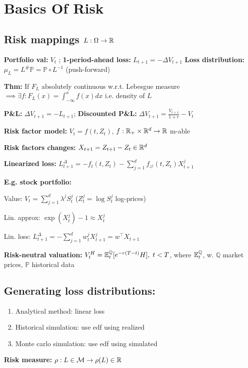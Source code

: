 \section*{Basics Of Risk}
\subsection*{Risk mappings $L:\Omega\rightarrow\mathbb{R}$}
\textbf{Portfolio val:} $V_t$ ; 
\textbf{1-period-ahead loss:} $L_{t+1}=-\Delta V_{t+1}$
\textbf{Loss distribution:} $\mu_L=L^\#\mathbb{P}=\mathbb{P}\circ L^{-1}$ (push-forward)

\textbf{Thm:} If $F_L$ absolutely continuous w.r.t. Lebesgue measure $\implies \exists f: F_L(x)=\int^x_{-\infty} f(x)dx$ i.e. density of $L$

\textbf{P\&L:} $\Delta V_{t+1}=-L_{t+1}$;
\textbf{Discounted P\&L:} $\Delta V_{t+1}=\frac{V_{t+1}}{1+r}-V_t$

\textbf{Risk factor model:} $V_t=f(t,Z_t)$, $f:\mathbb{R}_+\times\mathbb{R}^d\rightarrow\mathbb{R}$ m-able

\textbf{Risk factors changes:} $X_{t+1}=Z_{t+1}-Z_t\in \mathbb{R}^d$

\textbf{Linearized loss:} $L^\Delta_{t+1}=-f_t(t,Z_t)-\sum^d_{j=1} f_{z^j}(t,Z_t)X^j_{t+1}$

\textbf{E.g. stock portfolio:}

Value: $V_t=\sum^d_{j=1}\lambda^j S^j_t$ ($Z^j_t=\log S^j_t$ log-prices)

Lin. approx: $\exp(X^j_t)-1\approx X^j_t$

Lin. loss: $L^\Delta_{t+1}=-\sum^d_{j=1} w^j_t X^j_{t+1}=w^\top X_{t+1}$

\textbf{Risk-neutral valuation:} $V^H_t=\mathbb{E}^\mathbb{Q}_t[e^{-r(T-t)}H],\; t<T$, where $\mathbb{E}^\mathbb{Q}_t$, w. $\mathbb{Q}$ market prices, $\mathbb{P}$ historical data

\subsection*{Generating loss distributions:}
\begin{enumerate}
    \item Analytical method: linear loss
    \item Historical simulation: use edf using realized
    \item Monte carlo simulation: use edf using simulated
\end{enumerate}

\textbf{Risk measure:} $\rho:L\in \mathcal{M}\rightarrow \rho(L)\in\mathbb{R}$


